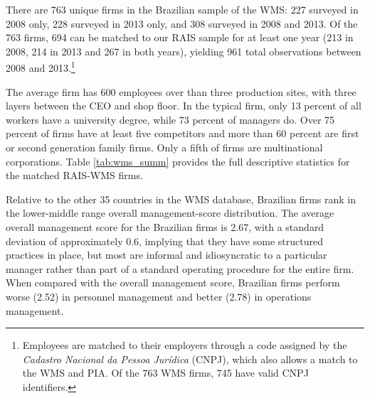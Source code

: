 There are 763 unique firms in the Brazilian sample of the WMS: 227 surveyed in 2008 only, 228 surveyed in 2013 only, and 308 surveyed in 2008 and 2013. Of the 763 firms, 694 can be matched to our RAIS sample for at least one year (213 in 2008, 214 in 2013 and 267 in both years), yielding 961 total observations between 2008 and 2013.\footnote{Employees are matched to their employers through a code assigned by the \textit{Cadastro Nacional da Pessoa Jur\'{i}dica} (CNPJ), which also allows a match to the WMS and PIA. Of the 763 WMS firms, 745 have valid CNPJ identifiers.} 

The average firm has 600 employees over than three production sites, with three layers between the CEO and shop floor. In the typical firm, only 13 percent of all workers have a university degree, while 73 percent of managers do. Over 75 percent of firms have at least five competitors and more than 60 percent are first or second generation family firms.  Only a fifth of firms are multinational corporations. Table \ref{tab:wms_summ} provides the full descriptive statistics for the matched RAIS-WMS firms.

Relative to the other 35 countries in the WMS database, Brazilian firms rank in the lower-middle range overall management-score distribution. The average overall management score for the Brazilian firms is 2.67, with a standard deviation of approximately 0.6, implying that they have some structured practices in place, but most are informal and idiosyncratic to a particular manager rather than part of a standard operating procedure for the entire firm. When compared with the overall management score, Brazilian firms perform worse (2.52) in personnel management and better (2.78) in operations management.


